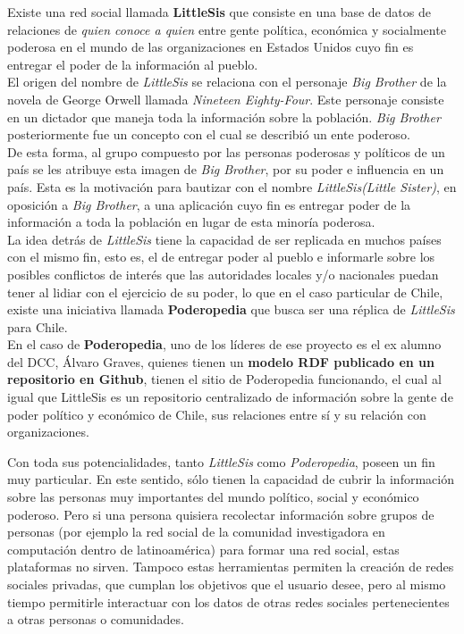 \begin{intro}
  Existe una red social llamada \textbf{LittleSis}\cite{littlesis} que consiste en una base de datos de relaciones de \emph{quien conoce a quien} entre gente política, económica y socialmente poderosa en el mundo de las organizaciones en Estados Unidos cuyo fin es entregar el poder de la información al pueblo.\\

  El origen del nombre de \emph{LittleSis} se relaciona con el personaje \emph{Big Brother} de la novela de George Orwell llamada \emph{Nineteen Eighty-Four}. Este personaje consiste en un dictador que maneja toda la información sobre la población. \emph{Big Brother} posteriormente fue un concepto con el cual se describió un ente poderoso.\\
 
  De esta forma, al grupo compuesto por las personas poderosas y políticos de un país se les atribuye esta imagen de \emph{Big Brother}, por su poder e influencia en un país. Esta es la motivación para bautizar con el nombre \emph{LittleSis}\emph{(Little Sister)}, en oposición a \emph{Big Brother}, a una aplicación cuyo fin es entregar poder de la información a toda la población en lugar de esta minoría poderosa.\\

  La idea detrás de \emph{LittleSis} tiene la capacidad de ser replicada en muchos países con el mismo fin, esto es, el de entregar poder al pueblo e informarle sobre los posibles conflictos de interés que las autoridades locales y/o nacionales puedan tener al lidiar con el ejercicio de su poder, lo que en el caso particular de Chile, existe una iniciativa llamada \textbf{Poderopedia}\cite{poderopedia} que busca ser una réplica de \emph{LittleSis} para Chile.\\

  En el caso de \textbf{Poderopedia}, uno de los líderes de ese proyecto es el ex alumno del DCC, Álvaro Graves, quienes tienen un \textbf{modelo RDF publicado en un repositorio en Github}\cite{podervocabulary}, tienen el sitio de Poderopedia funcionando, el cual al igual que LittleSis es un repositorio centralizado de información sobre la gente de poder político y económico de Chile, sus relaciones entre sí y su relación con organizaciones.

  Con toda sus potencialidades, tanto \emph{LittleSis} como \emph{Poderopedia}, poseen un fin muy particular. En este sentido, sólo tienen la capacidad de cubrir la información sobre las personas muy importantes del mundo político, social y económico poderoso. Pero si una persona quisiera recolectar información sobre grupos de personas (por ejemplo la red social de la comunidad investigadora en computación dentro de latinoamérica) para formar una red social, estas plataformas no sirven. Tampoco estas herramientas permiten la creación de redes sociales privadas, que cumplan los objetivos que el usuario desee, pero al mismo tiempo permitirle interactuar con los datos de otras redes sociales pertenecientes a otras personas o comunidades.\\


\end{intro}
